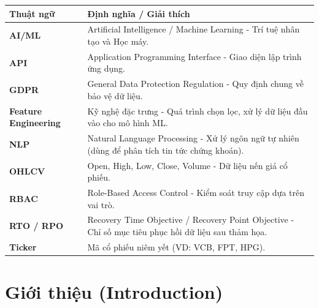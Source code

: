 \documentclass[12pt, a4paper]{article}
\begin{document}
\begin{table}[htbp]
    \centering
    \renewcommand{\arraystretch}{1.5}
    \begin{tabularx}{\textwidth}{|l|X|}
        \hline
        \rowcolor{gray!20}
        \textbf{Thuật ngữ}           & \textbf{Định nghĩa / Giải thích}                                                                    \\
        \hline
        \textbf{AI/ML}               & Artificial Intelligence / Machine Learning - Trí tuệ nhân tạo và Học máy.                           \\
        \hline
        \textbf{API}                 & Application Programming Interface - Giao diện lập trình ứng dụng.                                   \\
        \hline
        \textbf{GDPR}                & General Data Protection Regulation - Quy định chung về bảo vệ dữ liệu.                              \\
        \hline
        \textbf{Feature Engineering} & Kỹ nghệ đặc trưng - Quá trình chọn lọc, xử lý dữ liệu đầu vào cho mô hình ML.                       \\
        \hline
        \textbf{NLP}                 & Natural Language Processing - Xử lý ngôn ngữ tự nhiên (dùng để phân tích tin tức chứng khoán).      \\
        \hline
        \textbf{OHLCV}               & Open, High, Low, Close, Volume - Dữ liệu nến giá cổ phiếu.                                          \\
        \hline
        \textbf{RBAC}                & Role-Based Access Control - Kiểm soát truy cập dựa trên vai trò.                                    \\
        \hline
        \textbf{RTO / RPO}           & Recovery Time Objective / Recovery Point Objective - Chỉ số mục tiêu phục hồi dữ liệu sau thảm họa. \\
        \hline
        \textbf{Ticker}              & Mã cổ phiếu niêm yết (VD: VCB, FPT, HPG).                                                           \\
        \hline
    \end{tabularx}
\end{table}

\newpage

\section{Giới thiệu (Introduction)}
\end{document}
